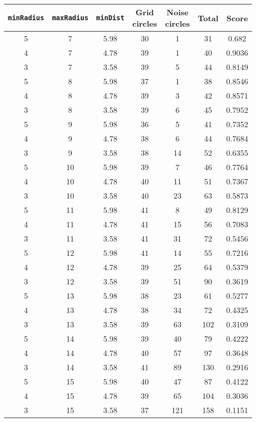 \documentclass[letterpaper, 12pt]{article}
\begin{document}
\begin{longtable}{|c|c|c|c|c|c|c|}
\hline
\textbf{\texttt{minRadius}} & \textbf{\texttt{maxRadius}} & \textbf{\texttt{minDist}} & \textbf{Grid circles} & \textbf{Noise circles} & \textbf{Total} & \textbf{Score} \\
\hline
5 & 7 & 5.98 & 30 & 1 & 31 & 0.682 \\
\hline
4 & 7 & 4.78 & 39 & 1 & 40 & 0.9036 \\
\hline
3 & 7 & 3.58 & 39 & 5 & 44 & 0.8149 \\
\hline
5 & 8 & 5.98 & 37 & 1 & 38 & 0.8546 \\
\hline
4 & 8 & 4.78 & 39 & 3 & 42 & 0.8571 \\
\hline
3 & 8 & 3.58 & 39 & 6 & 45 & 0.7952 \\
\hline
5 & 9 & 5.98 & 36 & 5 & 41 & 0.7352 \\
\hline
4 & 9 & 4.78 & 38 & 6 & 44 & 0.7684 \\
\hline
3 & 9 & 3.58 & 38 & 14 & 52 & 0.6355 \\
\hline
5 & 10 & 5.98 & 39 & 7 & 46 & 0.7764 \\
\hline
4 & 10 & 4.78 & 40 & 11 & 51 & 0.7367 \\
\hline
3 & 10 & 3.58 & 40 & 23 & 63 & 0.5873 \\
\hline
5 & 11 & 5.98 & 41 & 8 & 49 & 0.8129 \\
\hline
4 & 11 & 4.78 & 41 & 15 & 56 & 0.7083 \\
\hline
3 & 11 & 3.58 & 41 & 31 & 72 & 0.5456 \\
\hline
5 & 12 & 5.98 & 41 & 14 & 55 & 0.7216 \\
\hline
4 & 12 & 4.78 & 39 & 25 & 64 & 0.5379 \\
\hline
3 & 12 & 3.58 & 39 & 51 & 90 & 0.3619 \\
\hline
5 & 13 & 5.98 & 38 & 23 & 61 & 0.5277 \\
\hline
4 & 13 & 4.78 & 38 & 34 & 72 & 0.4325 \\
\hline
3 & 13 & 3.58 & 39 & 63 & 102 & 0.3109 \\
\hline
5 & 14 & 5.98 & 39 & 40 & 79 & 0.4222 \\
\hline
4 & 14 & 4.78 & 40 & 57 & 97 & 0.3648 \\
\hline
3 & 14 & 3.58 & 41 & 89 & 130 & 0.2916 \\
\hline
5 & 15 & 5.98 & 40 & 47 & 87 & 0.4122 \\
\hline
4 & 15 & 4.78 & 39 & 65 & 104 & 0.3036 \\
\hline
3 & 15 & 3.58 & 37 & 121 & 158 & 0.1151 \\

\end{longtable}
\end{document}
